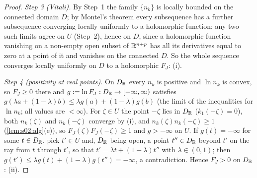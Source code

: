 \begin{proof}
\emph{Step 3 (Vitali).} By Step~1 the family $\{n_k\}$ is locally bounded on the connected domain $D$; by Montel's theorem every subsequence has a further subsequence converging locally uniformly to a holomorphic function; any two such limits agree on $U$ (Step~2), hence on $D$, since a holomorphic function vanishing on a non-empty open subset of $\mathbb R^{n+p}$ has all its derivatives equal to zero at a point of it and vanishes on the connected $D$. So the whole sequence converges locally uniformly on $D$ to a holomorphic $F_J$: (i).

\emph{Step 4 (positivity at real points).} On $D_{\mathbb R}$ every $n_k$ is positive and $\ln n_k$ is convex, so $F_J\ge0$ there and $g:=\ln F_J:D_{\mathbb R}\to[-\infty,\infty)$ satisfies $g(\lambda a+(1-\lambda)b)\le\lambda g(a)+(1-\lambda)g(b)$ (the limit of the inequalities for $\ln n_k$; all values are $<\infty$). For $\zeta\in U$ the point $-\zeta$ lies in $D_{\mathbb R}$ ($k_1(-\zeta)=0$), both $n_k(\zeta)$ and $n_k(-\zeta)$ converge by (i), and $n_k(\zeta)n_k(-\zeta)\ge1$ (\cref{lem:s02:alg}(e)), so $F_J(\zeta)F_J(-\zeta)\ge1$ and $g>-\infty$ on $U$. If $g(t)=-\infty$ for some $t\in D_{\mathbb R}$, pick $t'\in U$ and, $D_{\mathbb R}$ being open, a point $t''\in D_{\mathbb R}$ beyond $t'$ on the ray from $t$ through $t'$, so that $t'=\lambda t+(1-\lambda)t''$ with $\lambda\in(0,1)$; then $g(t')\le\lambda g(t)+(1-\lambda)g(t'')=-\infty$, a contradiction. Hence $F_J>0$ on $D_{\mathbb R}$: (ii).
\end{proof}

